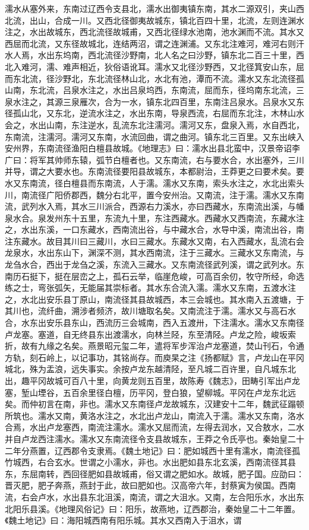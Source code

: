 \documentclass[12pt,UTF8]{ctexbook}
\begin{document}
濡水从塞外来，东南过辽西令支县北，濡水出御夷镇东南，其水二源双引，夹山西北流，出山，合成一川。又西北径御夷故城东，镇北百四十里，北流，左则连渊水注之，水出故城东，西北流径故城甫，又西北径绿水池南，池水渊而不流。其水又西屈而北流，又东径故城北，连结两沼，谓之连渊浦。又东北注难河，难河右则汗水人焉，水出东坞南，西北流径沙野南，北人名之曰沙野，镇东北二百三十里，西北入难河，濡、难声相近，狄俗语讹耳。濡水又北径沙野西，又北径箕安山东，屈而东北流，径沙野北，东北流径林山北，水北有池，潭而不流。濡水又东北流径孤山南，东北流，吕泉水注之，水出吕泉坞西，东南流，屈而东，径坞南东北流，三泉水注之，其源三泉雁次，合为一水，镇东北四百里，东南注吕泉水。吕泉水又东径孤山北，又东北，逆流水注之，水出东南，导泉西流，右屈而东北注，木林山水会之，水出山南，东注逆水，乱流东北注濡河。濡河又东，盘泉入焉，水自西北，东南流，注濡河。濡河又东南，水流回曲，谓之曲河。镇东北三百里。又东出峡入安州界，东南流径渔阳白檀县故城。《地理志》曰：濡水出县北蛮中，汉景帝诏李广曰：将军其帅师东辕，弧节白檀者也。又东南流，右与要水合，水出塞外，三川并导，谓之大要水也。东南流径要阳县故城东，本都尉治，王莽更之曰要术矣。要水又东南流，径白檀县而东南流，人于濡。濡水又东南，索头水注之，水北出索头川，南流径广阳侨郡西，魏分右北平，置今安州治。又南流，注于濡。濡水又东南流，武列水入焉，其水三川派合，西源右力溪水，亦曰西藏水，东南流出溪，与幡泉水合。泉发州东十五里，东流九十里，东注西藏水。西藏水又西南流，东藏水注之，水出东溪，一口东藏水，西南流出谷，与中藏水合，水导中溪，南流出谷，南注东藏水。故目其川曰三藏川，水曰三藏水。东藏水又南，右入西藏水，乱流右会龙泉水，水出东山下，渊深不测，其水西南流，注于三藏水。三藏水又东南流，与龙刍水合，西出于龙刍之溪，东流入三藏水。又东南流径武列溪，谓之武列水。东南历石挺下，挺在层峦之上，孤石云举，临崖危峻，可高百余仞，牧守所经，命选练之士，弯张弧矢，无能届其崇标者。其水东合流入濡。濡水又东南，五渡水注之，水北出安乐县丁原山，南流径其县故城西，本三会城也。其水南入五渡塘，于其川也，流纤曲，溯涉者频济，故川塘取名矣。又南流注于濡。濡水又与高石水合，水东出安乐县东山，西流历三会城南，西入五渡卅，下注濡水。濡水又东南径卢龙塞。塞道，自无终县东出渡濡水，向林兰陉，东至清陉。卢龙之险，峻坂索折，故有九缘之名矣。燕景昭元玺二年，遣将军步浑治卢龙塞道，焚山刊石，令通方轨，刻石岭上，以记事功，其铭尚存。而庾杲之注《扬都赋》言，卢龙山在平冈城北，殊为盂浪，远失事实。余按卢龙东越清陉，至凡城二百许里，自凡城东北出，趣平冈故城可百八十里，向黄龙则五百里，故陈寿《魏志》，田畴引军出卢龙塞，堑山堙谷，五百余里径白檀，历平冈，登白狼，望柳城。平冈在卢龙东北远矣。而仲初言在南，非也。濡水又东南径卢龙故城东，汉建安十二年，魏武征蹋顿所筑也。濡水又南，黄洛水注之，水北出卢龙山，南流入于濡。濡水又东南，洛水合焉，水出卢龙塞西，南流注濡水。濡水又屈而流，左得去润水，又合敖水，二水并自卢龙西注濡水。濡水又东南流径令支县故城东，王莽之令氏亭也。秦始皇二十二年分燕置，辽西郡令支隶焉。《魏土地记》曰：肥如城西十里有濡水，南流径孤竹城西，右合玄水。世谓之小濡水，非也。水出肥如县东北玄溪，西南流径其县东，东屈南转，西回径肥如县故城甫，俗又谓之肥如水。故城，肥子国。应劭曰：晋灭肥，肥子奔燕，燕封于此，故曰肥如也。汉高帝六年，封蔡寅为侯国。西南流，右会卢水，水出县东北沮溪，南流，谓之大沮水。又南，左合阳乐水，水出东北阳乐县溪。《地理风俗记》曰：阳乐，故燕地，辽西郡治，秦始皇二十二年置。《魏土地记》曰：海阳城西南有阳乐城。其水又西南入于沮水，谓
\end{document}
